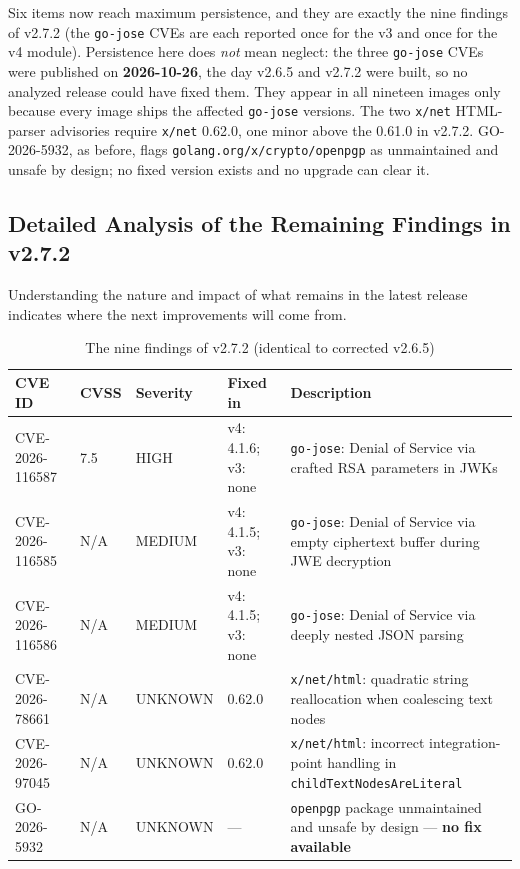 \documentclass{article}
\begin{document}
\noindent Six items now reach maximum persistence, and they are exactly the nine findings of v2.7.2 (the \texttt{go-jose} CVEs are each reported once for the v3 and once for the v4 module). Persistence here does \emph{not} mean neglect: the three \texttt{go-jose} CVEs were published on \textbf{2026-10-26}, the day v2.6.5 and v2.7.2 were built, so no analyzed release could have fixed them. They appear in all nineteen images only because every image ships the affected \texttt{go-jose} versions. The two \texttt{x/net} HTML-parser advisories require \texttt{x/net} 0.62.0, one minor above the 0.61.0 in v2.7.2. GO-2026-5932, as before, flags \texttt{golang.org/x/crypto/openpgp} as unmaintained and unsafe by design; no fixed version exists and no upgrade can clear it.

\subsection{Detailed Analysis of the Remaining Findings in v2.7.2}
Understanding the nature and impact of what remains in the latest release indicates where the next improvements will come from.

\begin{table}[H]
    \centering
    \caption{The nine findings of v2.7.2 (identical to corrected v2.6.5)}
    \label{tab:cve_details}
    {\small
    \begin{tabularx}{\textwidth}{l l l l >{\raggedright\arraybackslash}X}
        \toprule
        \textbf{CVE ID} & \textbf{CVSS} & \textbf{Severity} & \textbf{Fixed in} & \textbf{Description} \\
        \midrule
        CVE-2026-116587 & 7.5 & HIGH    & v4: 4.1.6; v3: none & \texttt{go-jose}: Denial of Service via crafted RSA parameters in JWKs \\
        \midrule
        CVE-2026-116585 & N/A & MEDIUM  & v4: 4.1.5; v3: none & \texttt{go-jose}: Denial of Service via empty ciphertext buffer during JWE decryption \\
        \midrule
        CVE-2026-116586 & N/A & MEDIUM  & v4: 4.1.5; v3: none & \texttt{go-jose}: Denial of Service via deeply nested JSON parsing \\
        \midrule
        CVE-2026-78661  & N/A & UNKNOWN & 0.62.0 & \texttt{x/net/html}: quadratic string reallocation when coalescing text nodes \\
        \midrule
        CVE-2026-97045  & N/A & UNKNOWN & 0.62.0 & \texttt{x/net/html}: incorrect integration-point handling in \texttt{childTextNodesAreLiteral} \\
        \midrule
        GO-2026-5932    & N/A & UNKNOWN & --- & \texttt{openpgp} package unmaintained and unsafe by design --- \textbf{no fix available} \\
        \bottomrule
    \end{tabularx}
    }
\end{table}
\end{document}
